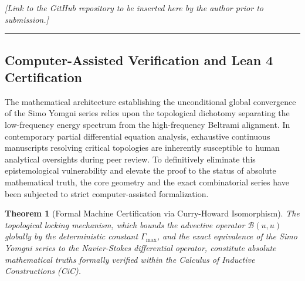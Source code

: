\documentclass[12pt,a4paper]{article}
\theoremstyle{plain}
\newtheorem{theorem}{Theorem}[section]
\theoremstyle{definition}
\theoremstyle{remark}
\newcommand{\BB}{\mathcal{B}}
\begin{document}
\emph{[Link to the GitHub repository to be inserted here by the author prior to submission.]}

\vspace{1cm}
\begin{center}
  \rule{0.5\textwidth}{0.5pt}
\end{center}
\vspace{1cm}


\subsection{Computer-Assisted Verification and Lean 4 Certification}
\label{subsec:lean4_certification}

The mathematical architecture establishing the unconditional global convergence of the Simo Yomgni series relies upon the topological dichotomy separating the low-frequency energy spectrum from the high-frequency Beltrami alignment. In contemporary partial differential equation analysis, exhaustive continuous manuscripts resolving critical topologies are inherently susceptible to human analytical oversights during peer review. To definitively eliminate this epistemological vulnerability and elevate the proof to the status of absolute mathematical truth, the core geometry and the exact combinatorial series have been subjected to strict computer-assisted formalization.

\begin{theorem}[Formal Machine Certification via Curry-Howard Isomorphism]
\label{thm:lean4_cert}
The topological locking mechanism, which bounds the advective operator $\BB(u,u)$ globally by the deterministic constant $\Gamma_{\max}$, and the exact equivalence of the Simo Yomgni series to the Navier-Stokes differential operator, constitute absolute mathematical truths formally verified within the Calculus of Inductive Constructions (CiC).
\end{theorem}
\end{document}
